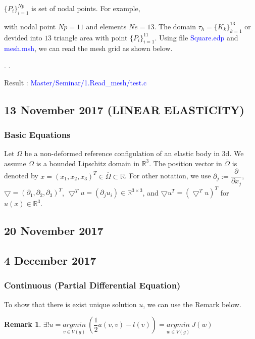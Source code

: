 \documentclass[a4paper,10pt]{article}
\newtheorem{remark}{Remark}[]
\begin{document}
$ \{ P_{i} \}_{i=1}^{Np} $ is set of nodal points. For example,

\vspace{4cm}

with nodal point $ Np =11 $ and elements $ Ne =13 $.  The domain $ \tau_{h}= \{K_{k}\}_{k=1}^{13} $ or devided into $ 13 $ triangle area with point $ \{P_{i}\}_{i=1}^{11} $. Using file \textcolor{blue}{Square.edp} and \textcolor{blue}{mesh.msh}, we can read the mesh grid as shown below.

\vspace{4cm}
.
\vspace{4cm}
.
\vspace{14cm}

Result : \textcolor{blue}{Master/Seminar/1.Read\_mesh/test.c}

\subsection{13 November 2017 (LINEAR ELASTICITY)}

\subsubsection{Basic Equations}
Let $ \Omega $ be a non-deformed reference configulation of an elastic body in 3d. We assume $ \Omega $ is a bounded Lipschitz domain in $ \mathbb{R}^{3} $. The position vector in $ \overline{\Omega} $ is denoted by $ x = (x_{1},x_{2},x_{3})^{T} \in \overline{\Omega} \subset \mathbb{R} $. For other notation, we use $ \partial_{j} := \dfrac{\partial}{\partial x_{j}} $, $ \bigtriangledown = (\partial_{1}, \partial_{2}, \partial_{3})^{T} $, $ \bigtriangledown^{T} u = (\partial_{j}u_{i}) \in \mathbb{R}^{3\times3} $, and $ \bigtriangledown u^{T} = (\bigtriangledown^{T} u)^{T}$ for $ u(x) \in \mathbb{R}^{3} $.

\subsection{20 November 2017}

\subsection{4 December 2017}

\subsubsection{Continuous (Partial Differential Equation)}
To show that there is exist unique solution $ u $, we can use the Remark below. 
\begin{remark}
	$ \exists ! u = \underset{v \in V(g)}{argmin} \ (\dfrac{1}{2} a(v,v)-l(v)) = \underset{w \in V(g)}{argmin} \ J(w)$
\end{remark}
\end{document}
